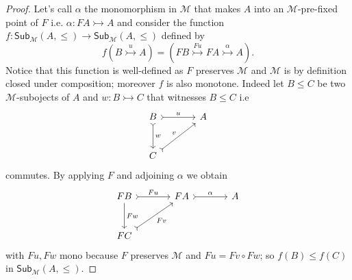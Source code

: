 \documentclass[letterpaper, 11pt, oneside]{memoir}
\theoremstyle{myteo}
\numberwithin{equation}{section}
\newcommand{\Sub}{\textsf{Sub}}
\begin{document}
\begin{proof}
  Let's call \(\alpha\) the monomorphism in \(\mathcal{M}\) that makes \(A\) into an \(\mathcal{M}\)-pre-fixed point of \(F\) i.e. \(\alpha : FA \rightarrowtail A\) and consider the function \(f : \Sub_{\mathcal{M}}(A, \leq) \to \Sub_{\mathcal{M}}(A, \leq)\) defined by
  \begin{equation*}
    f(B \overset{u}{\rightarrowtail} A) = (FB \overset{Fu}{\rightarrowtail} FA \overset{\alpha}{\rightarrowtail} A).
  \end{equation*}
  Notice that this function is well-defined as \(F\) preserves \(\mathcal{M}\) and \(\mathcal{M}\) is by definition closed under composition; moreover \(f\) is also monotone.
  Indeed let \(B \leq C\) be two \(\mathcal{M}\)-subojects of \(A\) and \(w : B \rightarrowtail C\) that witnesses \(B \leq C\) i.e
  \begin{equation*}
    \begin{tikzcd}[sep=large]
      B \ar[r, tail, "u"] \ar[d, tail, "w"] & A \\
      C \ar[ru, tail, "v"]&
    \end{tikzcd}
  \end{equation*}
  commutes.
  By applying \(F\) and adjoining \(\alpha\) we obtain
  \begin{equation*}
    \begin{tikzcd}[sep=large]
      FB \ar[r, tail, "Fu"] \ar[d, "Fw"] & FA \ar[r, tail, "\alpha"] & A \\
      FC \ar[ru, tail, "Fv"']
    \end{tikzcd}
  \end{equation*}
  with \(Fu, Fw\) mono because \(F\) preserves \(\mathcal{M}\) and \(Fu = Fv \circ Fw\); so \(f(B) \leq f(C)\) in \(\Sub_\mathcal{M}(A, \leq)\).


\end{proof}
\end{document}
